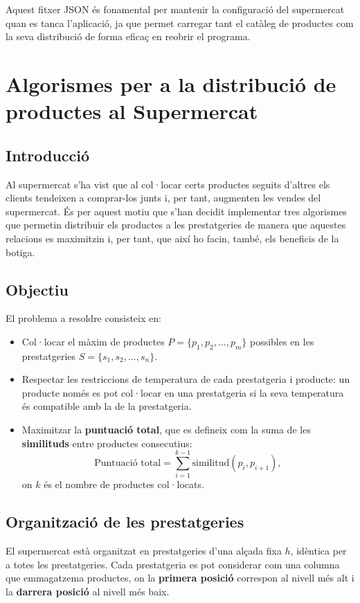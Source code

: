 \documentclass[a4paper,12pt]{report}
\begin{document}
\begin{itemize}
Aquest fitxer JSON és fonamental per mantenir la configuració del supermercat quan es tanca l'aplicació, ja que permet carregar tant el catàleg de productes com la seva distribució de forma eficaç en reobrir el programa.


\chapter{Algorismes per a la distribució de productes al Supermercat}

\section{Introducció}

Al supermercat s'ha vist que al col·locar certs productes seguits d'altres els clients tendeixen a comprar-los junts i, per tant, augmenten les vendes del supermercat.
És per aquest motiu que s'han decidit implementar tres algorismes que permetin distribuir els productes a les prestatgeries de manera que aquestes relacions es maximitzin i, per tant, que així ho facin, també, els beneficis de la botiga.

\section{Objectiu}
El problema a resoldre consisteix en:
\begin{itemize}
	\item Col·locar el màxim de productes \(P = \{p_1, p_2, \dots, p_m\}\) possibles en les prestatgeries \(S = \{s_1, s_2, \dots, s_n\}\).
	\item Respectar les restriccions de temperatura de cada prestatgeria i producte: un producte només es pot col·locar en una prestatgeria si la seva temperatura és compatible amb la de la prestatgeria.
	\item Maximitzar la \textbf{puntuació total}, que es defineix com la suma de les \textbf{similituds} entre productes consecutius:
	      \[
		      \text{Puntuació total} = \sum_{i=1}^{k-1} \text{similitud}(p_i, p_{i+1}),
	      \]
	      on \(k\) és el nombre de productes col·locats.
\end{itemize}

\section{Organització de les prestatgeries}

El supermercat està organitzat en prestatgeries d'una alçada fixa \( h \), idèntica per a totes les prestatgeries. Cada prestatgeria es pot considerar com una columna que emmagatzema productes, on la \textbf{primera posició} correspon al nivell més alt i la \textbf{darrera posició} al nivell més baix.


\end{itemize}
\end{document}
